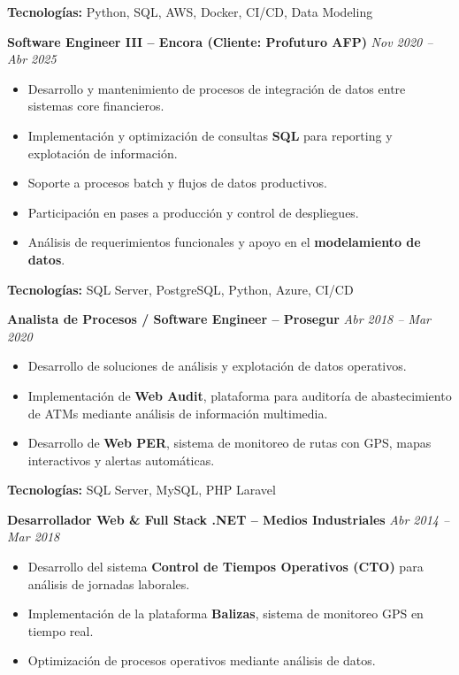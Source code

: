 \documentclass[11pt,a4paper]{article}
\begin{document}
\textbf{Tecnologías:} Python, SQL, AWS, Docker, CI/CD, Data Modeling

\vspace{10pt}

\textbf{Software Engineer III – Encora (Cliente: Profuturo AFP)} \hfill \textit{Nov 2020 – Abr 2025}
\begin{itemize}[leftmargin=*]
  \item Desarrollo y mantenimiento de procesos de integración de datos entre sistemas core financieros.
  \item Implementación y optimización de consultas \textbf{SQL} para reporting y explotación de información.
  \item Soporte a procesos batch y flujos de datos productivos.
  \item Participación en pases a producción y control de despliegues.
  \item Análisis de requerimientos funcionales y apoyo en el \textbf{modelamiento de datos}.
\end{itemize}

\textbf{Tecnologías:} SQL Server, PostgreSQL, Python, Azure, CI/CD

\vspace{10pt}

\textbf{Analista de Procesos / Software Engineer – Prosegur} \hfill \textit{Abr 2018 – Mar 2020}
\begin{itemize}[leftmargin=*]
  \item Desarrollo de soluciones de análisis y explotación de datos operativos.
  \item Implementación de \textbf{Web Audit}, plataforma para auditoría de abastecimiento de ATMs mediante análisis de información multimedia.
  \item Desarrollo de \textbf{Web PER}, sistema de monitoreo de rutas con GPS, mapas interactivos y alertas automáticas.
\end{itemize}

\textbf{Tecnologías:} SQL Server, MySQL, PHP Laravel

\vspace{10pt}

\textbf{Desarrollador Web \& Full Stack .NET – Medios Industriales} \hfill \textit{Abr 2014 – Mar 2018}
\begin{itemize}[leftmargin=*]
  \item Desarrollo del sistema \textbf{Control de Tiempos Operativos (CTO)} para análisis de jornadas laborales.
  \item Implementación de la plataforma \textbf{Balizas}, sistema de monitoreo GPS en tiempo real.
  \item Optimización de procesos operativos mediante análisis de datos.
\end{itemize}
\end{document}
